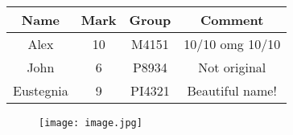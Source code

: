 \documentclass{article}
\begin{document}
\begin{tabular}{|c|c|c|c|}
\hline
Name & Mark & Group & Comment \\
\hline
Alex & 10 & M4151 & 10/10 omg 10/10 \\
\hline
John & 6 & P8934 & Not original \\
\hline
Eustegnia & 9 & PI4321 & Beautiful name! \\
\hline
\end{tabular}
\begin{figure}[h]
\centering
\texttt{[image: image.jpg]}
\end{figure}
\end{document}
